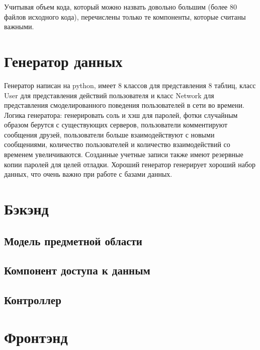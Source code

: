 Учитывая объем кода, который можно назвать довольно большим (более 80 файлов исходного кода), перечислены только те компоненты, которые считаны важными.


\section{Генератор данных}

Генератор написан на python, имеет 8 классов для представления 8 таблиц, класс User для представления действий пользователя и класс Network для представления смоделированного поведения пользователей в сети во времени.
Логика генератора: генерировать соль и хэш для паролей, фотки случайным образом берутся с существующих серверов, пользователи комментируют сообщения друзей, пользователи больше взаимодействуют с новыми сообщениями, количество пользователей и количество взаимодействий со временем увеличиваются.
Созданные учетные записи также имеют резервные копии паролей для целей отладки.
Хороший генератор генерирует хороший набор данных, что очень важно при работе с базами данных.


\section{Бэкэнд}

\subsection*{Модель предметной области}


\vbox{}

\subsection*{Компонент доступа к данным}


\vbox{}

\subsection*{Контроллер}


\vbox{}


\section{Фронтэнд}

